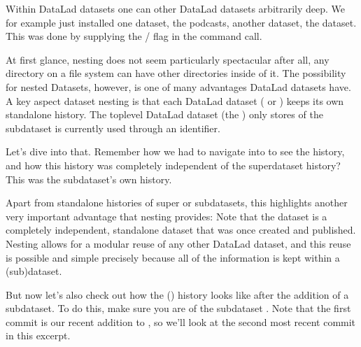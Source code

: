 \sphinxAtStartPar
Within DataLad datasets one can  other DataLad
datasets arbitrarily deep. We for example just installed one dataset, the
 podcasts,  another dataset, the  dataset.
This was done by supplying the / flag in the command call.

\sphinxAtStartPar
At first glance, nesting does not seem particularly spectacular \textendash{}
after all, any directory on a file system can have other directories inside of it.
The possibility for nested Datasets, however, is one of many advantages
DataLad datasets have.
A key aspect dataset nesting is that each DataLad dataset
( or ) keeps its own stand\sphinxhyphen{}alone
history. The top\sphinxhyphen{}level DataLad dataset (the ) only stores
 of the subdataset is currently used through an identifier.

\sphinxAtStartPar
Let’s dive into that.
Remember how we had to navigate into  to see the history,
and how this history was completely independent of the 
superdataset history? This was the subdataset’s own history.

\enlargethispage{.5\baselineskip}
\sphinxAtStartPar
Apart from stand\sphinxhyphen{}alone histories of super\sphinxhyphen{} or subdatasets, this highlights another
very important advantage that nesting provides: Note that the  dataset
is a completely independent, standalone dataset that was once created and
published. Nesting allows for a modular reuse of any other DataLad dataset,
and this reuse is possible and simple precisely because all of the information
is kept within a (sub)dataset.

\sphinxAtStartPar
But now let’s also check out how the  () history
looks like after the addition of a subdataset. To do this, make sure you are
 of the subdataset . Note that the first commit is our recent
addition to , so we’ll look at the second most recent commit in
this excerpt.

